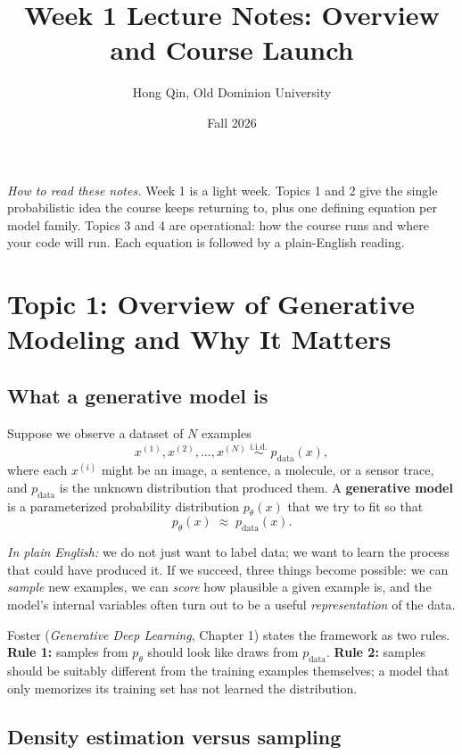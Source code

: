 \documentclass[11pt]{article}
\title{Week 1 Lecture Notes: Overview and Course Launch}
\author{Hong Qin, Old Dominion University}
\date{Fall 2026}
\theoremstyle{remark}
\begin{document}
\maketitle
\tableofcontents
\medskip

\noindent\textit{How to read these notes.} Week 1 is a light week. Topics 1 and 2 give the single probabilistic idea the course keeps returning to, plus one defining equation per model family. Topics 3 and 4 are operational: how the course runs and where your code will run. Each equation is followed by a plain-English reading.

\section{Topic 1: Overview of Generative Modeling and Why It Matters}

\subsection{What a generative model is}

Suppose we observe a dataset of $N$ examples
\[
x^{(1)}, x^{(2)}, \dots, x^{(N)} \;\overset{\text{i.i.d.}}{\sim}\; p_{\text{data}}(x),
\]
where each $x^{(i)}$ might be an image, a sentence, a molecule, or a sensor trace, and $p_{\text{data}}$ is the unknown distribution that produced them. A \textbf{generative model} is a parameterized probability distribution $p_\theta(x)$ that we try to fit so that
\[
p_\theta(x) \;\approx\; p_{\text{data}}(x).
\]

\noindent\textit{In plain English:} we do not just want to label data; we want to learn the process that could have produced it. If we succeed, three things become possible: we can \emph{sample} new examples, we can \emph{score} how plausible a given example is, and the model's internal variables often turn out to be a useful \emph{representation} of the data.

Foster (\emph{Generative Deep Learning}, Chapter 1) states the framework as two rules. \textbf{Rule 1:} samples from $p_\theta$ should look like draws from $p_{\text{data}}$. \textbf{Rule 2:} samples should be suitably different from the training examples themselves; a model that only memorizes its training set has not learned the distribution.

\subsection{Density estimation versus sampling}
\end{document}
